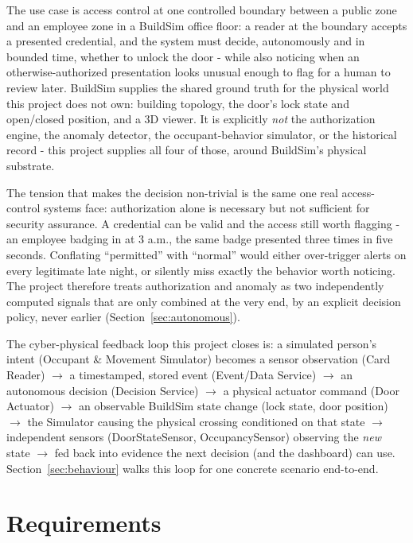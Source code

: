 \documentclass[11pt]{article}
\begin{document}
The use case is access control at one controlled boundary between a
public zone and an employee zone in a BuildSim office floor: a reader at
the boundary accepts a presented credential, and the system must decide,
autonomously and in bounded time, whether to unlock the door - while
also noticing when an otherwise-authorized presentation looks unusual
enough to flag for a human to review later. BuildSim supplies the shared
ground truth for the physical world this project does not own: building
topology, the door's lock state and open/closed position, and a 3D
viewer. It is explicitly \emph{not} the authorization engine, the anomaly
detector, the occupant-behavior simulator, or the historical record
- this project supplies all four of those, around
BuildSim's physical substrate.

The tension that makes the decision non-trivial is the same one real
access-control systems face: authorization alone is necessary but not
sufficient for security assurance. A credential can be valid and the
access still worth flagging - an employee badging in at 3 a.m., the
same badge presented three times in five seconds. Conflating ``permitted''
with ``normal'' would either over-trigger alerts on every legitimate late
night, or silently miss exactly the behavior worth noticing. The project
therefore treats authorization and anomaly as two independently computed
signals that are only combined at the very end, by an explicit decision
policy, never earlier (Section~\ref{sec:autonomous}).

The cyber-physical feedback loop this project closes is: a simulated
person's intent (Occupant \& Movement Simulator) becomes a sensor
observation (Card Reader) \(\rightarrow\) a timestamped, stored event
(Event/Data Service) \(\rightarrow\) an autonomous decision (Decision
Service) \(\rightarrow\) a physical actuator command (Door Actuator)
\(\rightarrow\) an observable BuildSim state change (lock state, door
position) \(\rightarrow\) the Simulator causing the physical crossing
conditioned on that state \(\rightarrow\) independent sensors
(DoorStateSensor, OccupancySensor) observing the \emph{new} state
\(\rightarrow\) fed back into evidence the next decision (and the
dashboard) can use. Section~\ref{sec:behaviour} walks this loop for one
concrete scenario end-to-end.

\section{Requirements}
\label{sec:requirements}
\end{document}
